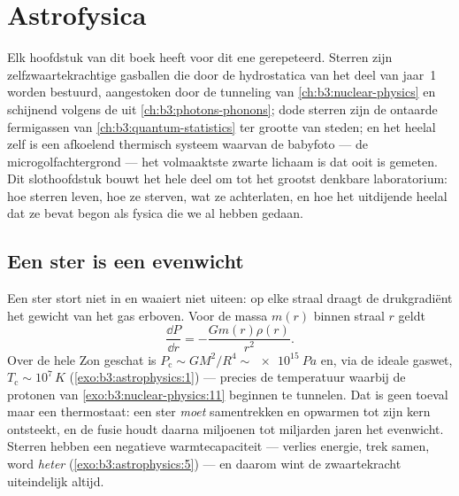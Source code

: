 \chapter{Astrofysica}\label{ch:b3:astrophysics}


Elk hoofdstuk van dit boek heeft voor dit ene gerepeteerd. Sterren
zijn zelfzwaartekrachtige gasballen die door de hydrostatica van het deel van
jaar~1 worden bestuurd, aangestoken door de tunneling van \cref{ch:b3:nuclear-physics}
en schijnend volgens de  uit \cref{ch:b3:photons-phonons}; dode sterren zijn
de ontaarde fermigassen van \cref{ch:b3:quantum-statistics} ter grootte van
steden; en het heelal zelf is een afkoelend thermisch systeem waarvan de
babyfoto --- de microgolfachtergrond --- het volmaaktste
zwarte lichaam is dat ooit is gemeten. Dit slothoofdstuk bouwt het hele
deel om tot het grootst denkbare laboratorium: hoe sterren leven, hoe
ze sterven, wat ze achterlaten, en hoe het uitdijende heelal
dat ze bevat begon als fysica die we al hebben gedaan.

\section{Een ster is een evenwicht}

\begin{proposition}\label{prop:b3:astrophysics:hydrostatic}
Een ster stort niet in en waaiert niet uiteen: op elke straal draagt de
drukgradiënt het gewicht van het gas erboven. Voor de
massa $m(r)$ binnen straal $r$ geldt
\[
\frac{\dd P}{\dd r} = -\frac{Gm(r)\rho(r)}{r^2} .
\]
Over de hele Zon geschat is $P_{\text{c}} \sim GM^2/R^4 \sim
\qty{e15}{Pa}$ en, via de ideale gaswet, $T_{\text{c}} \sim
10^7\,\unit{K}$ (\cref{exo:b3:astrophysics:1}) --- precies de
temperatuur waarbij de protonen van \cref{exo:b3:nuclear-physics:11}
beginnen te tunnelen. Dat is geen toeval maar een thermostaat: een ster
\emph{moet} samentrekken en opwarmen tot zijn kern ontsteekt, en de fusie
houdt daarna miljoenen tot miljarden jaren het evenwicht. Sterren
hebben een negatieve warmtecapaciteit --- verlies energie, trek samen, word
\emph{heter} (\cref{exo:b3:astrophysics:5}) --- en daarom wint de
zwaartekracht uiteindelijk altijd.
\end{proposition}

